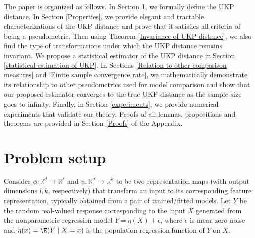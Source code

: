 \documentclass{article} %
\newcommand{\repone}{\phi}
\newcommand{\reptwo}{\psi}
\newcommand{\metricstname}{UKP }
\theoremstyle{plain}
\begin{document}
The paper is organized as follows. In Section \ref{Problem Setup}, we formally define the \metricstname distance. In Section \ref{Properties}, we provide elegant and tractable characterizations of the \metricstname distance and prove that it satisfies all criteria of being a pseudometric. Then using Theorem \ref{Invariance of UKP distance}, we also find the type of transformations under which the \metricstname distance remains invariant. We propose a statistical estimator of the \metricstname distance in Section \ref{statistical estimation of UKP}. In Sections \ref{Relation to other comparison measures} and \ref{Finite sample convergence rate}, we mathematically demonstrate its relationship to other pseudometrics used for model comparison and show that our proposed estimator converges to the true \metricstname distance as the sample size goes to infinity. Finally, in Section \ref{experiments}, we provide numerical experiments that validate our theory. Proofs of all lemmas, propositions and theorems are provided in Section \ref{Proofs} of the Appendix. 
\section{Problem setup}\label{Problem Setup}
Consider $\repone: \mathbb{R}^d \rightarrow \mathbb{R}^{\ell}$ and $\reptwo: \mathbb{R}^d \rightarrow \mathbb{R}^k$ to be two representation maps (with output dimensions $l, k$, respectively) that transform an input to its corresponding feature representation, typically obtained from a pair of trained/fitted models.
Let $Y$ be the random real-valued response corresponding to the input $X$ generated from the nonparametric regression model $Y=\eta(X) + \epsilon$, where $\epsilon$ is mean-zero noise and $\eta(x) = \E(Y \mid X = x)$ is the population regression function of $Y$ on $X$.
\end{document}
